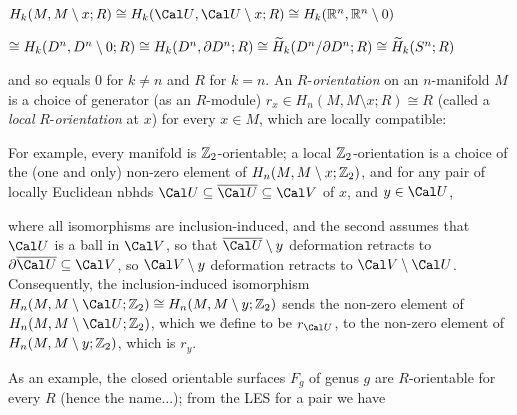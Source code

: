 \ssk

$H_k(M,M\setminus x;R)\cong H_k({\Cal U},{\Cal U}\setminus x;R)\cong H_k(\bbr^n,\bbr^n\setminus 0)$

\hfill $\cong H_k(D^n,D^n\setminus 0;R)\cong H_k(D^n,\partial D^n;R)\cong \widetilde{H}_k(D^n/\partial D^n;R)\cong \widetilde{H}_k(S^n;R)$

\ssk

and so equals $0$ for $k\neq n$ and $R$ for $k=n$. An $R$-{\it orientation} on an $n$-manifold $M$ is a choice of generator
(as an $R$-module) $r_x\in H_n(M,M\setminus x;R)\cong R$ (called a {\it local} $R$-{\it orientation} at $x$) for every 
$x\in M$, which are locally compatible: 

\msk

For example, every manifold is ${\Bbb Z}_2$-orientable; a local ${\Bbb Z}_2$-orientation is a choice of the (one and only)
non-zero element of $H_n(M,M\setminus x;{\Bbb Z}_2)$, and for any pair of locally Euclidean nbhds 
${\Cal U}\subseteq \overline{\Cal U}\subseteq {\Cal V}$ of $x$, and $y\in {\Cal U}$,

\ssk


\ssk

where all isomorphisms are inclusion-induced, and the second assumes that ${\Cal U}$ is a ball in ${\Cal V}$, so that
$\overline{\Cal U}\setminus y$ deformation retracts to $\del\overline{\Cal U}\subseteq {\Cal V}$, so 
${\Cal V}\setminus y$ deformation retracts to ${\Cal V}\setminus{\Cal U}$. Consequently, the inclusion-induced 
isomorphism $H_n(M,M\setminus{\Cal U};\bbz_2)\cong H_n(M,M\setminus y;\bbz_2)$ sends the non-zero element of
$H_n(M,M\setminus{\Cal U};\bbz_2)$, which we \u{define} to be $r_{\Cal U}$, to the non-zero element of 
$H_n(M,M\setminus y;{\Bbb Z}_2)$, which is $r_y$.

\vfill
\eject

As an example, the closed orientable surfaces $F_g$ of genus $g$ are $R$-orientable for every $R$ (hence the name...);
from the LES for a pair we have

\ssk

